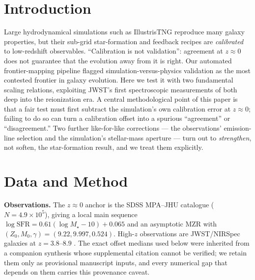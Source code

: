 \documentclass[twocolumn]{aastex631}
\begin{document}
\begin{abstract}
artifact. This is an automated, non-human-validated confrontation: we report a \emph{descriptive} discrepancy and a conservative lower bound, not a validated measurement, and it is fully reproducible from public data.
\end{abstract}


\section{Introduction}
Large hydrodynamical simulations such as IllustrisTNG \citep{pillepich18,nelson19} reproduce many galaxy properties, but their sub-grid star-formation and feedback recipes are \emph{calibrated} to low-redshift observables. ``Calibration is not validation'': agreement at $z\approx0$ does not guarantee that the evolution away from it is right. Our automated frontier-mapping pipeline flagged simulation-versus-physics validation as the most contested frontier in galaxy evolution. Here we test it with two fundamental scaling relations, exploiting JWST's first spectroscopic measurements of both deep into the reionization era. A central methodological point of this paper is that a fair test must first subtract the simulation's own calibration error at $z\approx0$; failing to do so can turn a calibration offset into a spurious ``agreement'' or ``disagreement.'' Two further like-for-like corrections --- the observations' emission-line selection and the simulation's stellar-mass aperture --- turn out to \emph{strengthen}, not soften, the star-formation result, and we treat them explicitly.

\section{Data and Method}
\textbf{Observations.} The $z\approx0$ anchor is the SDSS MPA--JHU catalogue \citep{brinchmann04,tremonti04} ($N=4.9\times10^{5}$), giving a local main sequence $\log\mathrm{SFR}=0.61(\log M_\star-10)+0.065$ and an asymptotic MZR with $(Z_0,M_0,\gamma)=(9.22,9.997,0.524)$. High-$z$ observations are JWST/NIRSpec galaxies at $z=3.8$--$8.9$ \citep{nakajima23}. The exact offset medians used below were inherited from a companion synthesis whose supplemental citation cannot be verified; we retain them only as provisional manuscript inputs, and every numerical gap that depends on them carries this provenance caveat.
\end{document}
